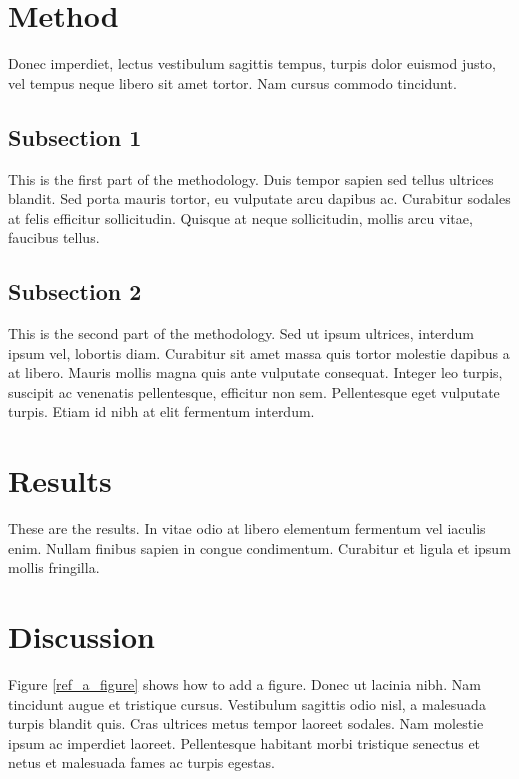 \documentclass[12pt,a4paperpaper,]{report}
\begin{document}
\section{Method}\label{method-1}

Donec imperdiet, lectus vestibulum sagittis tempus, turpis dolor euismod
justo, vel tempus neque libero sit amet tortor. Nam cursus commodo
tincidunt.

\subsection{Subsection 1}\label{subsection-1}

This is the first part of the methodology. Duis tempor sapien sed tellus
ultrices blandit. Sed porta mauris tortor, eu vulputate arcu dapibus ac.
Curabitur sodales at felis efficitur sollicitudin. Quisque at neque
sollicitudin, mollis arcu vitae, faucibus tellus.

\subsection{Subsection 2}\label{subsection-2-1}

This is the second part of the methodology. Sed ut ipsum ultrices,
interdum ipsum vel, lobortis diam. Curabitur sit amet massa quis tortor
molestie dapibus a at libero. Mauris mollis magna quis ante vulputate
consequat. Integer leo turpis, suscipit ac venenatis pellentesque,
efficitur non sem. Pellentesque eget vulputate turpis. Etiam id nibh at
elit fermentum interdum.

\section{Results}\label{results-2}

These are the results. In vitae odio at libero elementum fermentum vel
iaculis enim. Nullam finibus sapien in congue condimentum. Curabitur et
ligula et ipsum mollis fringilla.

\section{Discussion}\label{discussion-1}

Figure \ref{ref_a_figure} shows how to add a figure. Donec ut lacinia
nibh. Nam tincidunt augue et tristique cursus. Vestibulum sagittis odio
nisl, a malesuada turpis blandit quis. Cras ultrices metus tempor
laoreet sodales. Nam molestie ipsum ac imperdiet laoreet. Pellentesque
habitant morbi tristique senectus et netus et malesuada fames ac turpis
egestas.
\end{document}

